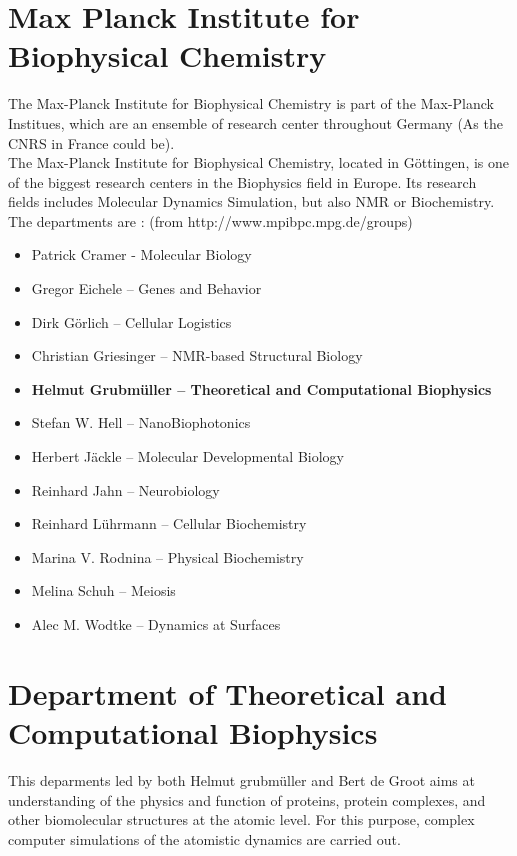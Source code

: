 \documentclass[12pt,twoside,a4paper]{report}
\begin{document}
\section*{Max Planck Institute for Biophysical Chemistry}

The Max-Planck Institute for Biophysical Chemistry is part of the Max-Planck Institues, which are an ensemble of research center throughout Germany (As the CNRS in France could be).\\

The Max-Planck Institute for Biophysical Chemistry, located in Göttingen, is one of the biggest research centers in the Biophysics field in Europe. Its research fields includes Molecular Dynamics Simulation, but also NMR or Biochemistry.\\
The departments are : (from http://www.mpibpc.mpg.de/groups)
\begin{itemize}
\item Patrick Cramer - Molecular Biology
\item Gregor Eichele – Genes and Behavior
\item Dirk Görlich – Cellular Logistics
\item Christian Griesinger – NMR-based Structural  Biology
\item \textbf{Helmut Grubmüller – Theoretical and Computational Biophysics}
\item Stefan W. Hell – NanoBiophotonics
\item Herbert Jäckle – Molecular Developmental Biology
\item Reinhard Jahn – Neurobiology
\item Reinhard Lührmann – Cellular Biochemistry
\item Marina V. Rodnina – Physical Biochemistry
\item Melina Schuh – Meiosis 
\item Alec M. Wodtke – Dynamics at Surfaces
\end{itemize}

\section*{Department of Theoretical and Computational Biophysics}

This deparments led by both Helmut grubmüller and Bert de Groot aims at understanding of the physics and function of proteins, protein complexes, and other biomolecular structures at the atomic level. For this purpose, complex computer simulations of the atomistic dynamics are carried out.\\
\end{document}

